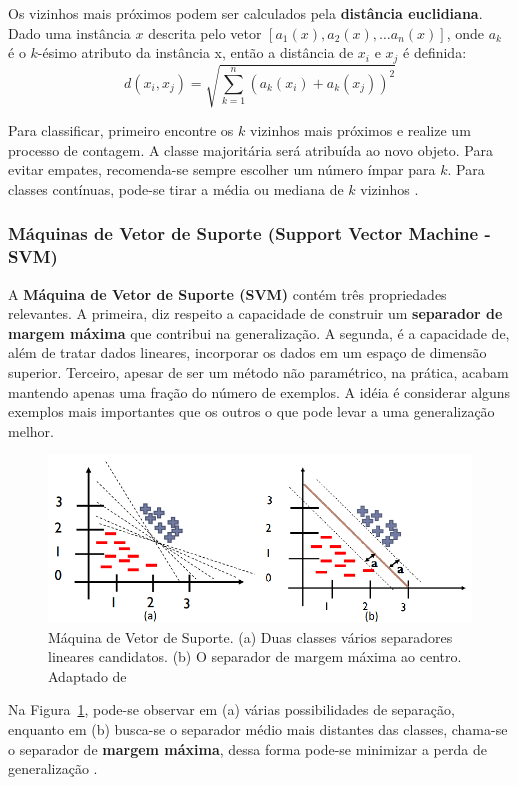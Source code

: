 \documentclass[12pt]{article}
\begin{document}
Os vizinhos mais próximos podem ser calculados pela \textbf{distância euclidiana}. Dado uma instância $x$ descrita pelo vetor $[a_1(x), a_2(x), \ldots a_n(x)]$, onde $a_k$ é o $k$-ésimo atributo da instância x, então a distância de $x_i$ e $x_j$ é definida:
\begin{equation}
  d(x_i, x_j) = \sqrt{\sum_{k = 1}^{n} (a_k(x_i) + a_k(x_j))^2 }
\end{equation}

Para classificar, primeiro encontre os $k$ vizinhos mais próximos e realize um processo de contagem. A classe majoritária será atribuída ao novo objeto. Para evitar empates, recomenda-se sempre escolher um número ímpar para $k$. Para classes contínuas, pode-se tirar a média ou mediana de $k$ vizinhos \cite{mitchell:1997,stuartnorvig:2013}.

\subsubsection{Máquinas de Vetor de Suporte (Support Vector Machine - SVM)}
A \textbf{Máquina de Vetor de Suporte (SVM)} contém três propriedades relevantes. A primeira, diz respeito a capacidade de construir um \textbf{separador de margem máxima} que contribui na generalização. A segunda, é a capacidade de, além de tratar dados lineares, incorporar os dados em um espaço de dimensão superior. Terceiro, apesar de ser um método não paramétrico, na prática, acabam mantendo apenas uma fração do número de exemplos. A idéia é considerar alguns exemplos mais importantes que os outros o que pode levar a uma generalização melhor.

\begin{figure}[h]
  \centering
  \includegraphics[width=.6\textwidth]{img/fig_svm.png}
  \caption{Máquina de Vetor de Suporte. (a) Duas classes vários separadores lineares candidatos. (b) O separador de margem máxima ao centro. Adaptado de \cite{bruno:2020}}
  \label{fig_svm}
\end{figure}

Na Figura~\ref{fig_svm}, pode-se observar em (a) várias possibilidades de separação, enquanto em (b) busca-se o separador médio mais distantes das classes, chama-se o separador de \textbf{margem máxima}, dessa forma pode-se minimizar a perda de generalização \cite{stuartnorvig:2013}.
\end{document}
